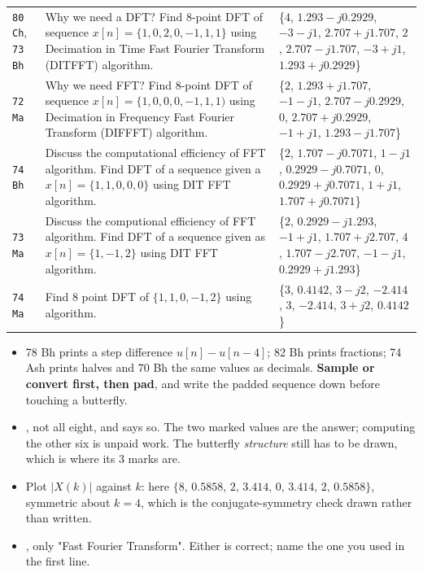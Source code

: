 {\begin{tabular}{@{}L{1.45cm}L{8.1cm}L{7.5cm}@{}}
\texttt{80 Ch}, \texttt{73 Bh} & Why we need a DFT? Find 8-point DFT of sequence
  $x[n]=\{1,0,2,0,-1,1,1\}$ using Decimation in Time Fast Fourier Transform (DITFFT)
  algorithm.  & \{$4$, $1.293{-}j0.2929$, $-3{-}j1$, $2.707{+}j1.707$, $2$, $2.707{-}j1.707$, $-3{+}j1$, $1.293{+}j0.2929$\} \\
\texttt{72 Ma} & Why we need FFT? Find 8-point DFT of sequence
  $x[n]=\{1,0,0,0,-1,1,1)$ using Decimation in Frequency Fast Fourier Transform
  (DIFFFT) algorithm.  & \{$2$, $1.293{+}j1.707$, $-1{-}j1$, $2.707{-}j0.2929$, $0$, $2.707{+}j0.2929$, $-1{+}j1$, $1.293{-}j1.707$\} \\
\texttt{74 Bh} & Discuss the computational efficiency of FFT algorithm. Find DFT of a
  sequence given a $x[n]=\{1,1,0,0,0\}$ using DIT FFT algorithm. 
  & \{$2$, $1.707{-}j0.7071$, $1{-}j1$, $0.2929{-}j0.7071$, $0$, $0.2929{+}j0.7071$, $1{+}j1$, $1.707{+}j0.7071$\} \\
\texttt{73 Ma} & Discuss the computional efficiency of FFT algorithm. Find DFT of a
  sequence given as $x[n]=\{1,-1,2\}$ using DIT FFT algorithm. 
  & \{$2$, $0.2929{-}j1.293$, $-1{+}j1$, $1.707{+}j2.707$, $4$, $1.707{-}j2.707$, $-1{-}j1$, $0.2929{+}j1.293$\} \\
\texttt{74 Ma} & Find 8 point DFT of $\{1,1,0,-1,2\}$ using  algorithm. 
   & \{$3$, $0.4142$, $3{-}j2$, $-2.414$, $3$, $-2.414$, $3{+}j2$, $0.4142$\} \\
\bottomrule
\end{tabular}}
\par\smallskip
\begin{itemize}
  \item {} 78 Bh prints a step
        difference $u[n]-u[n-4]$; 82 Bh prints fractions; 74 Ash prints halves and 70 Bh
        the same values as decimals. \textbf{Sample or convert first, then pad}, and
        write the padded sequence down before touching a butterfly.
  \item {}, not all eight, and says so. The two
        marked values are the answer; computing the other six is unpaid work. The
        butterfly \emph{structure} still has to be drawn, which is where its 3 marks are.
  \item {} Plot $|X(k)|$ against $k$:
        here $\{8,\,0.5858,\,2,\,3.414,\,0,\,3.414,\,2,\,0.5858\}$, symmetric about
        $k=4$, which is the conjugate-symmetry check drawn rather than written.
  \item {}, only "Fast Fourier Transform". Either is
        correct; name the one you used in the first line.
\end{itemize}

